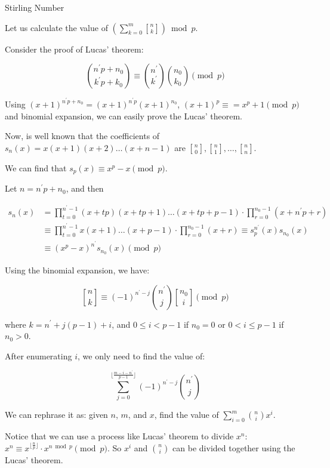 \begin{tutorial}{Stirling Number}

\newcommand{\stirling}[2]{\genfrac{[}{]}{0pt}{}{#1}{#2}}

Let us calculate the value of $(\sum_{k=0}^{m} \stirling{n}{k})\bmod p$.

Consider the proof of Lucas' theorem:

$$
\binom{n^\prime p + n_0}{k^\prime p + k_0} \equiv \binom{n^\prime}{k^\prime} \binom{n_0}{k_0} \pmod p
$$

Using $(x+1)^{n^\prime p + n_0}=(x+1)^{n^\prime p }(x+1)^{n_0}$, $(x+1)^p \equiv = x^p + 1 \pmod p$ and binomial expansion, we can easily prove the Lucas' theorem.

Now, is well known that the coefficients of $s_n(x)=x(x+1)(x+2) \ldots (x+n-1)$ are $\stirling{n}{0}, \stirling{n}{1}, \ldots, \stirling{n}{n}$.

We can find that $s_p(x) \equiv x^p - x \pmod p$.

Let $n = n^\prime p + n_0$, and then

$$
\begin{aligned}
s_n(x) &= \prod_{t=0}^{n^\prime-1}(x+tp)(x+tp+1) \ldots (x+tp+p-1) \cdot \prod_{r=0}^{n_0-1}(x+n^\prime p + r)\\
&\equiv \prod_{t=0}^{n^\prime-1}x(x+1) \ldots (x+p-1) \cdot \prod_{r=0}^{n_0-1}(x + r) \equiv s_p^{n^\prime}(x)s_{n_0}(x) \\
&\equiv(x^p-x)^{n^\prime}s_{n_0}(x) \pmod p
\end{aligned}
$$

Using the binomial expansion, we have:

$$
\stirling{n}{k} \equiv (-1)^{n^\prime - j}\binom{n^\prime}{j}\stirling{n_0}{i} \pmod p
$$

where $k=n^\prime+j(p-1)+i$, and $0 \le i < p-1$ if $n_0 = 0$ or $0 < i \le p-1$ if $n_0 > 0$.

After enumerating $i$, we only need to find the value of:

$$
\sum_{j=0}^{\lfloor \frac{m-i-n^\prime}{p-1}\rfloor}(-1)^{n^\prime-j}\binom{n^\prime}{j}
$$

We can rephrase it as: given $n$, $m$, and $x$, find the value of $\sum\limits_{i=0}^{m}\binom{n}{i}x^i$.

Notice that we can use a process like Lucas' theorem to divide $x^n$: $x^n\equiv x^{\lfloor\frac{n}{p}\rfloor} \cdot x^{n \bmod p} \pmod p$. So $x^i$ and $\binom{n}{i}$ can be divided together using the Lucas' theorem.


\end{tutorial}
